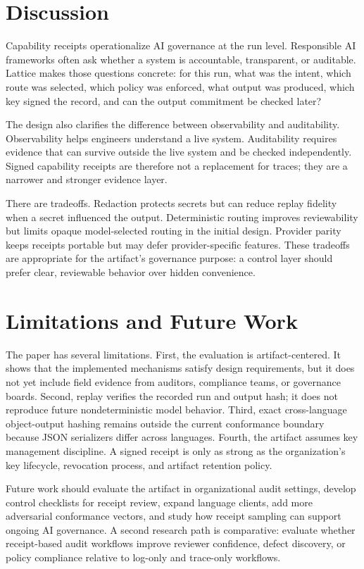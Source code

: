 \documentclass[conference]{IEEEtran}
\begin{document}
\section{Discussion}

Capability receipts operationalize AI governance at the run level. Responsible
AI frameworks often ask whether a system is accountable, transparent, or
auditable. Lattice makes those questions concrete: for this run, what was the
intent, which route was selected, which policy was enforced, what output was
produced, which key signed the record, and can the output commitment be checked
later?

The design also clarifies the difference between observability and auditability.
Observability helps engineers understand a live system. Auditability requires
evidence that can survive outside the live system and be checked independently.
Signed capability receipts are therefore not a replacement for traces; they are
a narrower and stronger evidence layer.

There are tradeoffs. Redaction protects secrets but can reduce replay fidelity
when a secret influenced the output. Deterministic routing improves reviewability
but limits opaque model-selected routing in the initial design. Provider parity
keeps receipts portable but may defer provider-specific features. These tradeoffs
are appropriate for the artifact's governance purpose: a control layer should
prefer clear, reviewable behavior over hidden convenience.

\section{Limitations and Future Work}

The paper has several limitations. First, the evaluation is artifact-centered. It
shows that the implemented mechanisms satisfy design requirements, but it does
not yet include field evidence from auditors, compliance teams, or governance
boards. Second, replay verifies the recorded run and output hash; it does not
reproduce future nondeterministic model behavior. Third, exact cross-language
object-output hashing remains outside the current conformance boundary because
JSON serializers differ across languages. Fourth, the artifact assumes key
management discipline. A signed receipt is only as strong as the organization's
key lifecycle, revocation process, and artifact retention policy.

Future work should evaluate the artifact in organizational audit settings,
develop control checklists for receipt review, expand language clients, add more
adversarial conformance vectors, and study how receipt sampling can support
ongoing AI governance. A second research path is comparative: evaluate whether
receipt-based audit workflows improve reviewer confidence, defect discovery, or
policy compliance relative to log-only and trace-only workflows.
\end{document}
